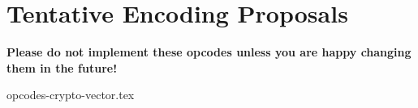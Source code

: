 
\newpage
\section{Tentative Encoding Proposals}

{\bf Please do not implement these opcodes unless you are happy changing
them in the future!}
\medskip

{opcodes-crypto-vector.tex}

